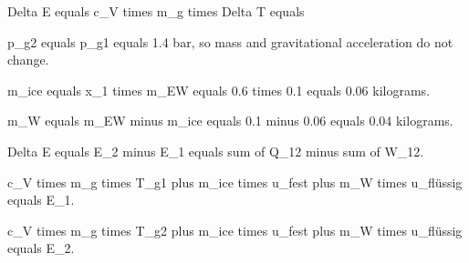 Delta E equals c_V times m_g times Delta T equals  

p_g2 equals p_g1 equals 1.4 bar, so mass and gravitational acceleration do not change.  

m_ice equals x_1 times m_EW equals 0.6 times 0.1 equals 0.06 kilograms.  

m_W equals m_EW minus m_ice equals 0.1 minus 0.06 equals 0.04 kilograms.  

Delta E equals E_2 minus E_1 equals sum of Q_12 minus sum of W_12.  

c_V times m_g times T_g1 plus m_ice times u_fest plus m_W times u_flüssig equals E_1.  

c_V times m_g times T_g2 plus m_ice times u_fest plus m_W times u_flüssig equals E_2.
